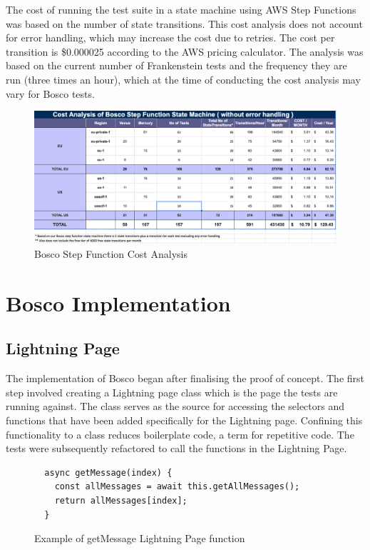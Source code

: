 \documentclass[12pt,a4paper,titlepage]{report}
\begin{document}
The cost of running the test suite in a state machine using AWS Step Functions was based on the number of state transitions.\autocite{Amazon} 
This cost analysis does not account for error handling, which may increase the cost due to retries. The cost per transition is \$0.000025 according to the AWS pricing calculator. 
The analysis was based on the current number of Frankenstein tests and the frequency they are run (three times an hour), which at the time of conducting the cost analysis may vary for Bosco tests.

\begin{figure}[H]
 \centering
 \includegraphics[width=15cm]{./diagrams/sfcost}
 \caption{Bosco Step Function Cost Analysis}
\end{figure}

\chapter{Bosco Implementation}
\section{Lightning Page}
The implementation of Bosco began after finalising the proof of concept. 
The first step involved creating a Lightning page class which is the page the tests are running against. 
The class serves as the source for accessing the selectors and functions that have been added specifically for the Lightning page. 
Confining this functionality to a class reduces boilerplate code, a term for repetitive code. 
The tests were subsequently refactored to call the functions in the Lightning Page.

\begin{figure}[H]
 \begin{tcolorbox}
  \begin{verbatim}
  async getMessage(index) {
    const allMessages = await this.getAllMessages();
    return allMessages[index];
  }
  \end{verbatim}
 \end{tcolorbox}
 \caption{Example of getMessage Lightning Page function}
\end{figure}
\end{document}
